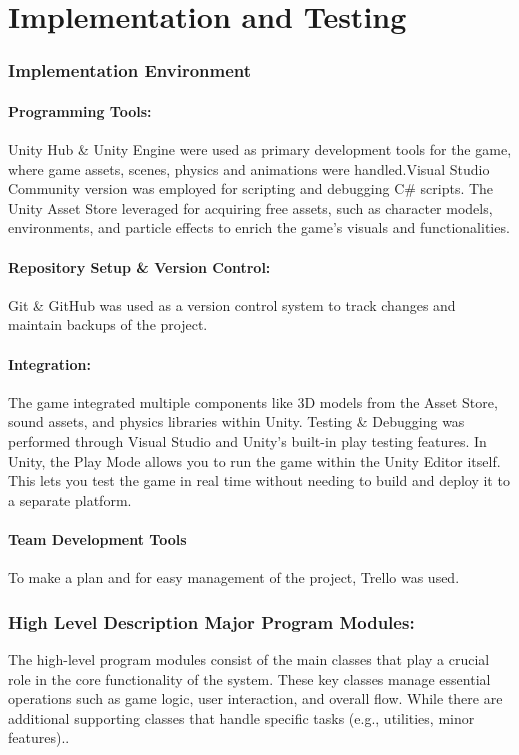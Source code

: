 \chapter{Implementation and Testing}
\subsection{Implementation Environment}
\subsubsection{Programming Tools:}
Unity Hub \& Unity Engine were used as primary development tools for the game, where game assets, scenes, physics and animations were handled.Visual Studio Community version was employed for scripting and debugging C\# scripts.
The Unity Asset Store leveraged for acquiring free assets, such as character models, environments, and particle effects to enrich the game's visuals and functionalities.
\subsubsection{Repository Setup \& Version Control:}
Git \& GitHub was used as a version control system to track changes and maintain backups of the project.
\subsubsection{Integration:}
The game integrated multiple components like 3D models from the Asset Store, sound assets, and physics libraries within Unity.
Testing \& Debugging was performed through Visual Studio and Unity’s built-in play testing features.
In Unity, the Play Mode allows you to run the game within the Unity Editor itself. This lets you test the game in real time without needing to build and deploy it to a separate platform.
\subsubsection{Team Development Tools}
To make a plan and for easy management of the project, Trello was used.
\subsection{High Level Description Major Program Modules:}
The high-level program modules consist of the main classes that play a crucial role in the core functionality of the system. These key classes manage essential operations such as game logic, user interaction, and overall flow. While there are additional supporting classes that handle specific tasks (e.g., utilities, minor features)..
